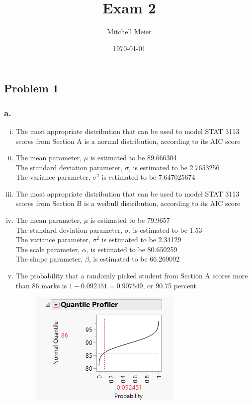 \documentclass[14pt]{article}
\title{Exam 2}
\author{Mitchell Meier}
\date{\today}
\begin{document}
\maketitle

\subsection*{Problem 1}

\subsubsection*{a.}
\begin{enumerate}[(i)]

\item
The most appropriate distribution that can be used to model STAT 3113 scores from Section A is a normal distribution, according to its AIC score

\item
The mean parameter, $\mu$ is estimated to be 89.666304 \\
The standard deviation parameter, $\sigma$, is estimated to be 2.7653256 \\
The variance parameter, $\sigma^2$ is estimated to be 7.647025674 \\

\item
The most appropriate distribution that can be used to model STAT 3113 scores from Section B is a weibull distribution, according to its AIC score

\item
The mean parameter, $\mu$ is estimated to be 79.9657 \\
The standard deviation parameter, $\sigma$, is estimated to be 1.53 \\
The variance parameter, $\sigma^2$ is estimated to be 2.34129 \\
The scale parameter, $\alpha$, is estimated to be 80.650259 \\
The shape parameter, $\beta$, is estimated to be 66.269092 

\item
The probability that a randomly picked student from Section A scores more than 86 marks is $1 - 0.092451 = 0.907549$, or 90.75 percent 

\begin{figure}[h]
\centering
\includegraphics{exam2/1v.png}
\end{figure}


\end{enumerate}
\end{document}
